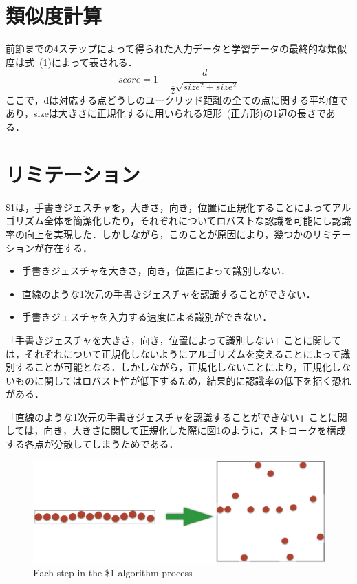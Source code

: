 \section{類似度計算}
前節までの4ステップによって得られた入力データと学習データの最終的な類似度は式~(1)によって表される．
\begin{equation}
score = 1 - \frac{d}{\frac{1}{2}\sqrt{size^2 + size^2}}
\end{equation}
ここで，dは対応する点どうしのユークリッド距離の全ての点に関する平均値であり，sizeは大きさに正規化するに用いられる矩形~(正方形)の1辺の長さである．

\section{リミテーション}
\$1は，手書きジェスチャを，大きさ，向き，位置に正規化することによってアルゴリズム全体を簡潔化したり，それぞれについてロバストな認識を可能にし認識率の向上を実現した．しかしながら，このことが原因により，幾つかのリミテーションが存在する．

\begin{itemize}
\item 手書きジェスチャを大きさ，向き，位置によって識別しない．
\item 直線のような1次元の手書きジェスチャを認識することができない．
\item 手書きジェスチャを入力する速度による識別ができない．
\end{itemize}


「手書きジェスチャを大きさ，向き，位置によって識別しない」ことに関しては，それぞれについて正規化しないようにアルゴリズムを変えることによって識別することが可能となる．しかしながら，正規化しないことにより，正規化しないものに関してはロバスト性が低下するため，結果的に認識率の低下を招く恐れがある．

「直線のような1次元の手書きジェスチャを認識することができない」ことに関しては，向き，大きさに関して正規化した際に図\ref{fig:line}のように，ストロークを構成する各点が分散してしまうためである．

\begin{figure} [!h]
\centering
\includegraphics [width=0.8\columnwidth]{img/line.eps}
\caption{Each step in the \$1 algorithm process}
\label{fig:line}
\end{figure}

